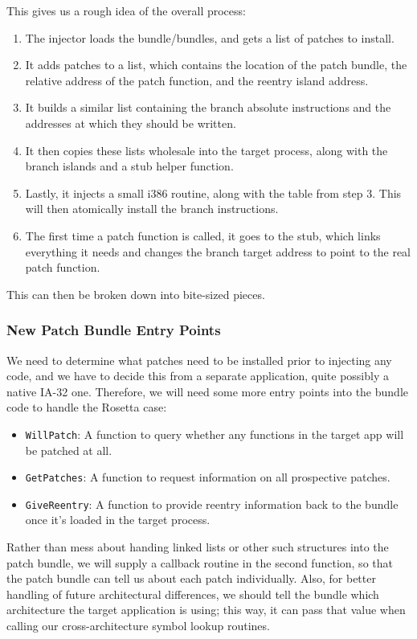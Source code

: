 \documentclass[english]{article}
\begin{document}
This gives us a rough idea of the overall process:

\begin{enumerate}
  \item The injector loads the bundle/bundles, and gets a list of patches to install.
  \item It adds patches to a list, which contains the location of the patch bundle, the relative address of the patch function, and the reentry island address.
  \item It builds a similar list containing the branch absolute instructions and the addresses at which they should be written.
  \item It then copies these lists wholesale into the target process, along with the branch islands and a stub helper function.
  \item Lastly, it injects a small i386 routine, along with the table from step 3. This will then atomically install the branch instructions.
  \item The first time a patch function is called, it goes to the stub, which links everything it needs and changes the branch target address to point to the real patch function.
\end{enumerate}

This can then be broken down into bite-sized pieces.

\subsubsection{New Patch Bundle Entry Points}
We need to determine what patches need to be installed prior to injecting any code, and we have to decide this from a separate application, quite possibly a native IA-32 one. Therefore, we will need some more entry points into the bundle code to handle the Rosetta case: 

\begin{itemize}
  \item \texttt{WillPatch}: A function to query whether any functions in the target app will be patched at all.
  \item \texttt{GetPatches}: A function to request information on all prospective patches.
  \item \texttt{GiveReentry}: A function to provide reentry information back to the bundle once it's loaded in the target process.
\end{itemize}

Rather than mess about handing linked lists or other such structures into the patch bundle, we will supply a callback routine in the second function, so that the patch bundle can tell us about each patch individually. Also, for better handling of future architectural differences, we should tell the bundle which architecture the target application is using; this way, it can pass that value when calling our cross-architecture symbol lookup routines.
\end{document}
